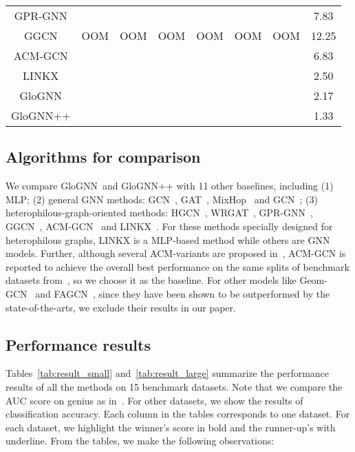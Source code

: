 \documentclass[nohyperref]{article}
\theoremstyle{plain}
\theoremstyle{definition}
\theoremstyle{remark}
\newcommand{\rom}[1]{\uppercase\expandafter{\romannumeral #1\relax}}
\newcommand{\ada}{GloGNN}
\begin{document}
\begin{table*}[h]
{\begin{tabular}{|c|c|c|c|c|c|c||c|}
    GPR-GNN              &      &            &  &  &  &   &  7.83 \\ 
    GGCN               &    OOM    &     OOM        & OOM &   OOM & OOM & OOM  &   12.25  \\ 
    ACM-GCN               &        &             &  &    &   &  &   6.83 \\ 
       LINKX                &      &            &  &  &  &   &   2.50  \\  \hline
     \ada               &      &         &  &  &  &   & 2.17  \\  
      \ada++               &      &         &  &  &  &   &  1.33   \\  \hline
      
           
\end{tabular}
}
\end{table*}


\subsection{Algorithms for comparison}
We compare \ada\ and \ada++ with 11 other baselines,
including
(1) MLP;
(2) general GNN methods: 
GCN~\cite{kipf2016semi}, GAT~\cite{velivckovic2017graph},
MixHop~\cite{abu2019mixhop} and GCN\rom{2}~\cite{chen2020simple};
(3) heterophilous-graph-oriented methods:
HGCN~\cite{zhu2020beyond}, 
WRGAT~\cite{suresh2021breaking},
GPR-GNN~\cite{chien2020adaptive}, GGCN~\cite{yan2021two},
ACM-GCN~\cite{luan2021heterophily} and LINKX~\cite{lim2021large}.
For these methods specially designed for heterophilous graphs,
LINKX is a MLP-based method while others are GNN models.
Further,
although several ACM-variants are proposed in~\cite{luan2021heterophily},
ACM-GCN is reported to achieve the overall best performance on the same splits of benchmark datasets from~\cite{pei2020geom},
so we choose it as the baseline.
For other models like Geom-GCN~\cite{pei2020geom} and FAGCN~\cite{bo2021beyond},
since they have been shown to be outperformed by the state-of-the-arts,
we exclude their results in our paper.











\subsection{Performance results}
Tables~\ref{tab:result_small} and~\ref{tab:result_large} summarize the performance results of all the methods on 15 benchmark datasets.
Note that 
we compare the AUC score on 
genius as in~\cite{lim2021large}.
For other datasets, 
we show the results of classification accuracy.
Each column in the tables corresponds to one dataset.
For each dataset,
we highlight the winner's score in bold and the runner-up's with underline.
From the tables,
we make the following observations:
\end{document}
